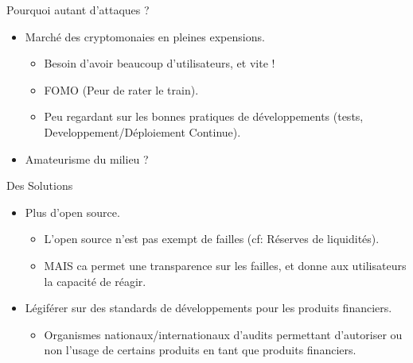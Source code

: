 \begin{frame}{Pourquoi autant d'attaques ?}%
    \begin{itemize}
        \item Marché des cryptomonaies en pleines expensions.
        \begin{itemize}
            \item Besoin d'avoir beaucoup d'utilisateurs, et vite !
            \item FOMO (Peur de rater le train).
            \item Peu regardant sur les bonnes pratiques de développements (tests, Developpement/Déploiement Continue).
        \end{itemize}
        \item Amateurisme du milieu ?
    \end{itemize}
\end{frame}

\begin{frame}{Des Solutions}
    
    \begin{itemize}
        \item Plus d'open source.
        \begin{itemize}
            \item L'open source n'est pas exempt de failles (cf: Réserves de liquidités).
            \item MAIS ca permet une transparence sur les failles, et donne aux utilisateurs la capacité de réagir.
        \end{itemize}
        \item Légiférer sur des standards de développements pour les produits financiers.
        \begin{itemize}
            \item Organismes nationaux/internationaux d'audits permettant d'autoriser ou non l'usage de certains produits en tant que produits financiers.
        \end{itemize}
    \end{itemize}
\end{frame}
